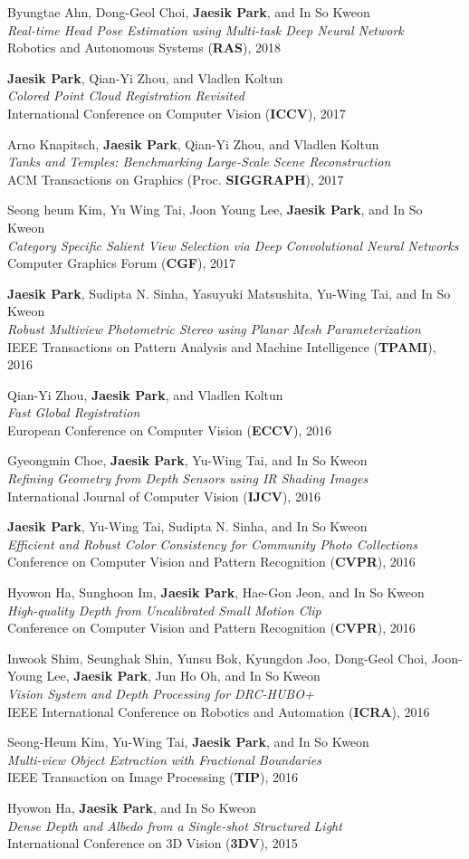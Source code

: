 \documentclass[letterpaper,11pt]{article}
\newcommand{\publicationItem}[3]{
  \small{
  \item{#1\\ \emph{#2}\\ #3\vspace{-2pt}}
  }
}
\begin{document}
    \publicationItem{Byungtae Ahn, Dong-Geol Choi, \textbf{Jaesik Park}, and In So Kweon}{Real-time Head Pose Estimation using Multi-task Deep Neural Network}{Robotics and Autonomous Systems (\textbf{RAS}), 2018}
    \publicationItem{\textbf{Jaesik Park}, Qian-Yi Zhou, and Vladlen Koltun}{Colored Point Cloud Registration Revisited}{International Conference on Computer Vision (\textbf{ICCV}), 2017}
    \publicationItem{Arno Knapitsch, \textbf{Jaesik Park}, Qian-Yi Zhou, and Vladlen Koltun}{Tanks and Temples: Benchmarking Large-Scale Scene Reconstruction}{ACM Transactions on Graphics (Proc. \textbf{SIGGRAPH}), 2017}
    \publicationItem{Seong heum Kim, Yu Wing Tai, Joon Young Lee, \textbf{Jaesik Park}, and In So Kweon}{Category Specific Salient View Selection via Deep Convolutional Neural Networks}{Computer Graphics Forum (\textbf{CGF}), 2017}
    \publicationItem{\textbf{Jaesik Park}, Sudipta N. Sinha, Yasuyuki Matsushita, Yu-Wing Tai, and In So Kweon}{Robust Multiview Photometric Stereo using Planar Mesh Parameterization}{IEEE Transactions on Pattern Analysis and Machine Intelligence (\textbf{TPAMI}), 2016}
    \publicationItem{Qian-Yi Zhou, \textbf{Jaesik Park}, and Vladlen Koltun}{Fast Global Registration}{European Conference on Computer Vision (\textbf{ECCV}), 2016}
    \publicationItem{Gyeongmin Choe, \textbf{Jaesik Park}, Yu-Wing Tai, and In So Kweon}{Refining Geometry from Depth Sensors using IR Shading Images}{International Journal of Computer Vision (\textbf{IJCV}), 2016}
    \publicationItem{\textbf{Jaesik Park}, Yu-Wing Tai, Sudipta N. Sinha, and In So Kweon}{Efficient and Robust Color Consistency for Community Photo Collections}{Conference on Computer Vision and Pattern Recognition (\textbf{CVPR}), 2016}
    \publicationItem{Hyowon Ha, Sunghoon Im, \textbf{Jaesik Park}, Hae-Gon Jeon, and In So Kweon}{High-quality Depth from Uncalibrated Small Motion Clip}{Conference on Computer Vision and Pattern Recognition (\textbf{CVPR}), 2016}
    \publicationItem{Inwook Shim, Seunghak Shin, Yunsu Bok, Kyungdon Joo, Dong-Geol Choi, Joon-Young Lee, \textbf{Jaesik Park}, Jun Ho Oh, and In So Kweon}{Vision System and Depth Processing for DRC-HUBO+}{IEEE International Conference on Robotics and Automation (\textbf{ICRA}), 2016}
    \publicationItem{Seong-Heum Kim, Yu-Wing Tai, \textbf{Jaesik Park}, and In So Kweon}{Multi-view Object Extraction with Fractional Boundaries}{IEEE Transaction on Image Processing (\textbf{TIP}), 2016}
    \publicationItem{Hyowon Ha, \textbf{Jaesik Park}, and In So Kweon}{Dense Depth and Albedo from a Single-shot Structured Light}{International Conference on 3D Vision (\textbf{3DV}), 2015}
\end{document}
